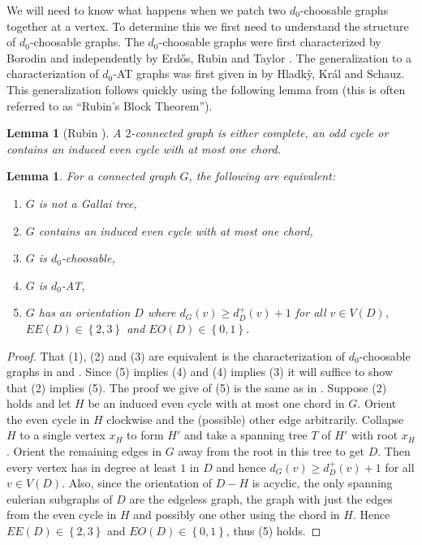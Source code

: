 \documentclass[12pt]{article}
\theoremstyle{plain}
\newtheorem{lem}[thm]{Lemma}
\theoremstyle{definition}
\theoremstyle{remark}
\newcommand{\set}[1]{\left\{ #1 \right\}}
\begin{document}
We will need to know what happens when we patch two $d_0$-choosable graphs together at a vertex.  To determine this we first need to understand the structure of $d_0$-choosable graphs.  The $d_0$-choosable graphs were first characterized by Borodin \cite{borodin1977criterion} and independently by Erd\H{o}s, Rubin and Taylor \cite{erdos1979choosability}.  The generalization to a characterization of $d_0$-AT graphs was first given in \cite{Hladky} by Hladk{\`y}, Kr{\'a}l and Schauz.  This generalization follows quickly using the following lemma from \cite{erdos1979choosability} (this is often referred to as ``Rubin's Block Theorem'').

\begin{lem}[Rubin \cite{erdos1979choosability}]\label{RubinBlock}
A $2$-connected graph is either complete, an odd cycle or contains an induced even cycle with at most one chord.
\end{lem}

\begin{lem}\label{d0Characterization}
For a connected graph $G$, the following are equivalent:
\begin{enumerate}
\item $G$ is not a Gallai tree,
\item $G$ contains an induced even cycle with at most one chord,
\item $G$ is $d_0$-choosable,
\item $G$ is $d_0$-AT,
\item $G$ has an orientation $D$ where $d_G(v) \geq d_{D}^+(v) + 1$ for all $v \in V(D)$, $EE(D) \in \set{2,3}$ and $EO(D) \in \set{0,1}$.
\end{enumerate}
\end{lem}
\begin{proof}
That (1), (2) and (3) are equivalent is the characterization of $d_0$-choosable graphs in \cite{borodin1977criterion} and \cite{erdos1979choosability}.  Since (5) implies (4) and (4) implies (3) it will suffice to show that (2) implies (5).  The proof we give of (5) is the same as in \cite{Hladky}. Suppose (2) holds and let $H$ be an induced even cycle with at most one chord in $G$.  Orient the even cycle in $H$ clockwise and the (possible) other edge arbitrarily.  Collapse $H$ to a single vertex $x_H$ to form $H'$ and take a spanning tree $T$ of $H'$ with root $x_H$.  Orient the remaining edges in $G$ away from the root in this tree to get $D$.  Then every vertex has in degree at least $1$ in $D$ and hence $d_G(v) \geq d_{D}^+(v) + 1$ for all $v \in V(D)$.  Also, since the orientation of $D-H$ is acyclic, the only spanning eulerian subgraphs of $D$ are the edgeless graph, the graph with just the edges from the even cycle in $H$ and possibly one other using the chord in $H$.  Hence $EE(D) \in \set{2,3}$ and $EO(D) \in \set{0,1}$, thus (5) holds. 
\end{proof}
\end{document}

